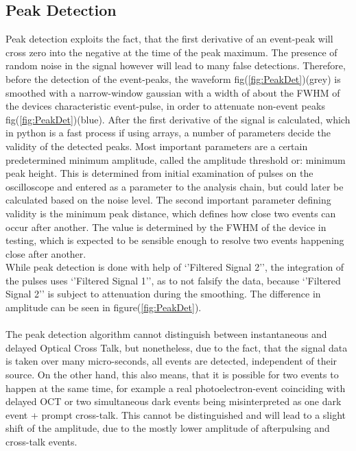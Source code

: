 \documentclass[12pt,article,type=msc,colorback,accentcolor=tud9c]{tudthesis}
\begin{document}
\clearpage
\subsection{Peak Detection}
\begin{wrapfigure}{R}{0.5\textwidth}
\centering
\texttt{[image: D:/OwnCloudData/00\_WriteUp/04\_Thesis/Pic/Analysis/\{HAM\_T22.0\_Vb68.5.trcFiltered2Zoom]}.pdf}
\caption[Peak Detection]{\label{fig:PeakDet}''Filtered Signal 1'' in grey before smoothing with a narrow gaussian to generate `'Filtered Signal 2'' in blue, which is used for peak finding.}
\end{wrapfigure}
Peak detection exploits the fact, that the first derivative of an event-peak will cross zero into the negative at the time of the peak maximum. The presence of random noise in the signal however will lead to many false detections. Therefore, before the detection of the event-peaks, the waveform fig(\ref{fig:PeakDet})(grey) is smoothed with a narrow-window gaussian with a width of about the FWHM of the devices characteristic event-pulse, in order to attenuate non-event peaks fig(\ref{fig:PeakDet})(blue). After the first derivative of the signal is calculated, which in python is a fast process if using arrays, a number of parameters decide the validity of the detected peaks. Most important parameters are a certain predetermined minimum amplitude, called the amplitude threshold or: minimum peak height. This is determined from initial examination of pulses on the oscilloscope and entered as a parameter to the analysis chain, but could later be calculated based on the noise level. The second important parameter defining validity is the minimum peak distance, which defines how close two events can occur after another. The value is determined by the FWHM of the device in testing, which is expected to be sensible enough to resolve two events happening close after another.\\
While peak detection  is done with help of `'Filtered Signal 2'', the integration of the pulses uses `'Filtered Signal 1'', as to not falsify the data, because `'Filtered Signal 2'' is subject to attenuation during the smoothing. The difference in amplitude can be seen in figure(\ref{fig:PeakDet}).\\\\
The peak detection algorithm cannot distinguish between instantaneous and delayed Optical Cross Talk, but nonetheless, due to the fact, that the signal data is taken over many micro-seconds, all events are detected, independent of their source. On the other hand, this also means, that it is possible for two events to happen at the same time, for example a real photoelectron-event coinciding with delayed OCT or two simultaneous dark events being misinterpreted as one dark event + prompt cross-talk. This cannot be distinguished and will lead to a slight shift of the amplitude, due to the mostly lower amplitude of afterpulsing and cross-talk events. 
\end{document}
